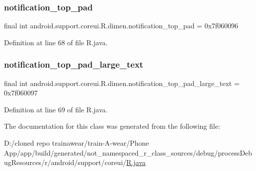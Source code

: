 \subsubsection{\texorpdfstring{notification\_top\_pad}{notification\_top\_pad}}
{\footnotesize\ttfamily final int android.\+support.\+coreui.\+R.\+dimen.\+notification\+\_\+top\+\_\+pad = 0x7f060096\hspace{0.3cm}{\ttfamily [static]}}



Definition at line 68 of file R.\+java.

\mbox{\label{classandroid_1_1support_1_1coreui_1_1_r_1_1dimen_ae54b3572dbe6c64903907da04f41c7a2}} 
\subsubsection{\texorpdfstring{notification\_top\_pad\_large\_text}{notification\_top\_pad\_large\_text}}
{\footnotesize\ttfamily final int android.\+support.\+coreui.\+R.\+dimen.\+notification\+\_\+top\+\_\+pad\+\_\+large\+\_\+text = 0x7f060097\hspace{0.3cm}{\ttfamily [static]}}



Definition at line 69 of file R.\+java.



The documentation for this class was generated from the following file\+:\begin{DoxyCompactItemize}
\item 
D\+:/cloned repo trainawear/train-\/\+A-\/wear/\+Phone App/app/build/generated/not\+\_\+namespaced\+\_\+r\+\_\+class\+\_\+sources/debug/process\+Debug\+Resources/r/android/support/coreui/\mbox{\hyperlink{process_debug_resources_2r_2android_2support_2coreui_2_r_8java}{R.\+java}}\end{DoxyCompactItemize}
